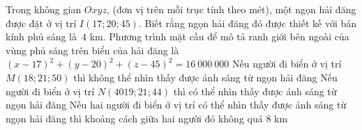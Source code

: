 \begin{ex}%
	Trong không gian $Oxyz$, (đơn vị trên mỗi trục tính theo mét), một ngọn hải đăng được đặt ở vị trí $  I\left(17;20;45\right)$. Biết rằng ngọn hải đăng đó được thiết kế với bán kính phủ sáng là~$ 4$ km.
	\choiceTF 
		{\True Phương trình mặt cầu để mô tả ranh giới bên  ngoài của vùng phủ sáng trên biển của hải đăng là~$(x-17)^2+(y-20)^2+(z-45)^2=16\ 000\ 000$}
		{Nếu người  đi biển ở vị trí $ M\left(18;21;50\right)$ thì không thể nhìn thấy được ánh sáng từ ngọn hải đăng}
		{\True Nếu người đi biển ở vị trí $ N(4019;21;44)$ thì có thể nhìn thấy được ánh  sáng từ ngọn hải đăng}
		{\True Nếu hai người đi biển ở vị trí có thể nhìn thấy được ánh  sáng từ ngọn hải đăng thì khoảng cách giữa hai người đó không quá $ 8$ km}
\end{ex}

